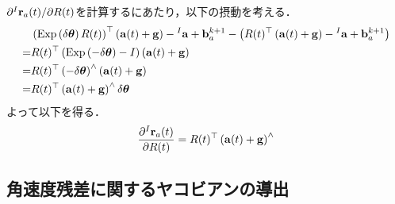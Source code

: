 $\partial {}^{I}{\bf r}_{a}(t) / \partial R(t)$を計算するにあたり，以下の摂動を考える．
%
\begin{align}
  \begin{split}
    & \left( {\rm Exp} \left( \delta \boldsymbol \theta \right) R(t) \right)^{\top} \left( {\bf a}(t) + {\bf g} \right) - {}^{I}{\bf a} + {\bf b}_{a}^{k+1} - \left( R(t)^{\top}  \left( {\bf a}(t) + {\bf g} \right) - {}^{I}{\bf a} + {\bf b}_{a}^{k+1} \right) \\
    = & R(t)^{\top}  \left( {\rm Exp} \left( -\delta \boldsymbol \theta \right) - I \right) \left( {\bf a}(t) + {\bf g} \right) \\
    = & R(t)^{\top}  \left( -\delta \boldsymbol \theta\right)^{\wedge} \left( {\bf a}(t) + {\bf g} \right) \\
    = & R(t)^{\top} \left( {\bf a}(t) + {\bf g} \right)^{\wedge} \delta \boldsymbol \theta
  \end{split}
\end{align}
%
よって以下を得る．
%
\begin{align}
  \frac{ \partial {}^{I}{\bf r}_{a}(t) }{ \partial R(t) } = R(t)^{\top}  \left( {\bf a}(t) + {\bf g} \right)^{\wedge}
\end{align}












\subsection{角速度残差に関するヤコビアンの導出}


